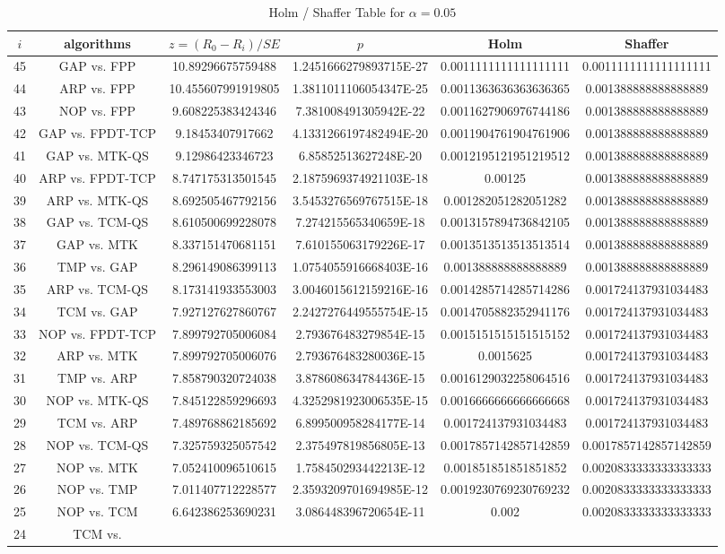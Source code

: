 \documentclass[a4paper,10pt]{article}
\begin{document}
\begin{landscape}
\begin{table}[!htp]
\centering\tiny
\caption{Holm / Shaffer Table for $\alpha=0.05$}
\begin{tabular}{cccccc}
$i$&algorithms&$z=(R_0 - R_i)/SE$&$p$&Holm&Shaffer\\
\hline
45&GAP vs. FPP&10.89296675759488&1.2451666279893715E-27&0.0011111111111111111&0.0011111111111111111\\44&ARP vs. FPP&10.455607991919805&1.3811011106054347E-25&0.0011363636363636365&0.001388888888888889\\43&NOP vs. FPP&9.608225383424346&7.381008491305942E-22&0.0011627906976744186&0.001388888888888889\\42&GAP vs. FPDT-TCP&9.18453407917662&4.1331266197482494E-20&0.0011904761904761906&0.001388888888888889\\41&GAP vs. MTK-QS&9.12986423346723&6.85852513627248E-20&0.0012195121951219512&0.001388888888888889\\40&ARP vs. FPDT-TCP&8.747175313501545&2.1875969374921103E-18&0.00125&0.001388888888888889\\39&ARP vs. MTK-QS&8.692505467792156&3.5453276569767515E-18&0.001282051282051282&0.001388888888888889\\38&GAP vs. TCM-QS&8.610500699228078&7.274215565340659E-18&0.0013157894736842105&0.001388888888888889\\37&GAP vs. MTK&8.337151470681151&7.610155063179226E-17&0.0013513513513513514&0.001388888888888889\\36&TMP vs. GAP&8.296149086399113&1.0754055916668403E-16&0.001388888888888889&0.001388888888888889\\35&ARP vs. TCM-QS&8.173141933553003&3.0046015612159216E-16&0.0014285714285714286&0.001724137931034483\\34&TCM vs. GAP&7.927127627860767&2.2427276449555754E-15&0.0014705882352941176&0.001724137931034483\\33&NOP vs. FPDT-TCP&7.899792705006084&2.793676483279854E-15&0.0015151515151515152&0.001724137931034483\\32&ARP vs. MTK&7.899792705006076&2.793676483280036E-15&0.0015625&0.001724137931034483\\31&TMP vs. ARP&7.858790320724038&3.878608634784436E-15&0.0016129032258064516&0.001724137931034483\\30&NOP vs. MTK-QS&7.845122859296693&4.3252981923006535E-15&0.0016666666666666668&0.001724137931034483\\29&TCM vs. ARP&7.489768862185692&6.899500958284177E-14&0.001724137931034483&0.001724137931034483\\28&NOP vs. TCM-QS&7.325759325057542&2.375497819856805E-13&0.0017857142857142859&0.0017857142857142859\\27&NOP vs. MTK&7.052410096510615&1.758450293442213E-12&0.001851851851851852&0.0020833333333333333\\26&NOP vs. TMP&7.011407712228577&2.3593209701694985E-12&0.0019230769230769232&0.0020833333333333333\\25&NOP vs. TCM&6.642386253690231&3.086448396720654E-11&0.002&0.0020833333333333333\\24&TCM vs. 
\end{tabular}
\end{table}
\end{landscape}
\end{document}
